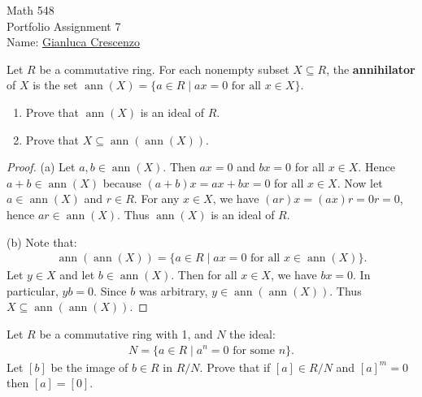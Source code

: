 \documentclass[10pt,twoside,openany]{memoir}
\begin{document}
\begin{center}
    {\Large Math 548 \\[0.1in]Portfolio Assignment 7}\\[.175in]
    {Name:} {\underline{Gianluca Crescenzo\hspace*{2in}}}\\[0.15in]
    \end{center}
    \vspace{4pt}
\begin{problem}[S19, P4]
Let $R$ be a commutative ring. For each nonempty subset $X \subseteq R$, the \textbf{annihilator} of $X$ is the set $\operatorname{ann}(X) = \{a \in R \mid ax = 0 \text{ for all }x \in X\}$.
\begin{enumerate}[label = (\alph*),itemsep=1pt,topsep=3pt]
    \item Prove that $\operatorname{ann}(X)$ is an ideal of $R$.
    \item Prove that $X \subseteq \operatorname{ann}(\operatorname{ann}(X))$.
\end{enumerate}
\end{problem}
    {\color{blue} \begin{proof}
        (a) Let $a,b \in \operatorname{ann}(X)$. Then $ax = 0$ and $bx = 0$ for all $x \in X$. Hence $a+b \in \operatorname{ann}(X)$ because $(a+b)x = ax + bx = 0$ for all $x \in X$. Now let $a \in \operatorname{ann}(X)$ and $r \in R$. For any $x \in X$, we have $(ar)x = (ax)r = 0r = 0$, hence $ar \in \operatorname{ann}(X)$. Thus $\operatorname{ann}(X)$ is an ideal of $R$.

        (b) Note that:
            \begin{equation*}
            \begin{split}
                \operatorname{ann}(\operatorname{ann}(X)) = \{a \in R \mid ax = 0 \text{ for all }x \in \operatorname{ann}(X)\}.
            \end{split}
            \end{equation*}
        Let $y \in X$ and let $b \in \operatorname{ann}(X)$. Then for all $x \in X$, we have $bx = 0$. In particular, $yb = 0$. Since $b$ was arbitrary, $y \in \operatorname{ann}(\operatorname{ann}(X))$. Thus $X \subseteq \operatorname{ann}(\operatorname{ann}(X))$.
    \end{proof}}
\begin{problem}[S24, P3]
    Let $R$ be a commutative ring with 1, and $N$ the ideal:
        \begin{equation*}
        \begin{split}
            N = \{a \in R \mid a^n = 0 \text{ for some }n \}.
        \end{split}
        \end{equation*}
    Let $[b]$ be the image of $b \in R$ in $R/N$. Prove that if $[a] \in R/N$ and $[a]^m = 0$ then $[a] = [0]$. 
\end{problem}
\end{document}
